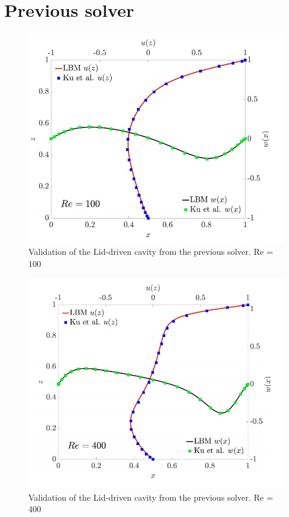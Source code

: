 \documentclass[12pt, openany]{book}
\begin{document}
\section{Previous solver}
  \begin{figure}[H]
  	\centering
  	\includegraphics[width=\linewidth]{Resources/Images/AntonioValid/prevValid1.png}
  	\caption{Validation of the Lid-driven cavity from the previous solver. Re = 100}
  	\label{fig:prevValid1}
  \end{figure}
    \begin{figure}[H]
    	\centering
    	\includegraphics[width=\linewidth]{Resources/Images/AntonioValid/prevValid2.png}
    	\caption{Validation of the Lid-driven cavity from the previous solver. Re = 400}
    	\label{fig:prevValid2}
    \end{figure}
\end{document}
